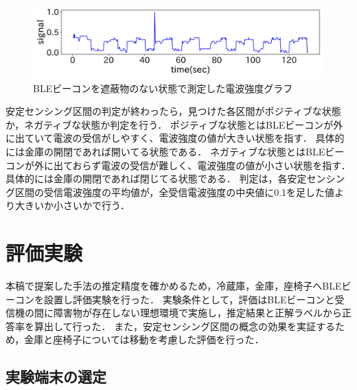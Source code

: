 \begin{figure}[tbh]
    \centering
    \includegraphics[width=14cm]{images/chapter3/bokoboko.pdf}
    \caption{BLEビーコンを遮蔽物のない状態で測定した電波強度グラフ}
    \label{nomal-data}
\end{figure}

安定センシング区間の判定が終わったら，見つけた各区間がポジティブな状態か，ネガティブな状態か判定を行う．
ポジティブな状態とはBLEビーコンが外に出ていて電波の受信がしやすく、電波強度の値が大きい状態を指す．
具体的には金庫の開閉であれば開いてる状態である．
ネガティブな状態とはBLEビーコンが外に出ておらず電波の受信が難しく、電波強度の値が小さい状態を指す．
具体的には金庫の開閉であれば閉じてる状態である．
判定は，各安定センシング区間の受信電波強度の平均値が，全受信電波強度の中央値に0.1を足した値より大きいか小さいかで行う．


\section{評価実験}
本稿で提案した手法の推定精度を確かめるため，冷蔵庫，金庫，座椅子へBLEビーコンを設置し評価実験を行った．
実験条件として，評価はBLEビーコンと受信機の間に障害物が存在しない理想環境で実施し，推定結果と正解ラベルから正答率を算出して行った．
また，安定センシング区間の概念の効果を実証するため，金庫と座椅子については移動を考慮した評価を行った．


\subsection{実験端末の選定}

